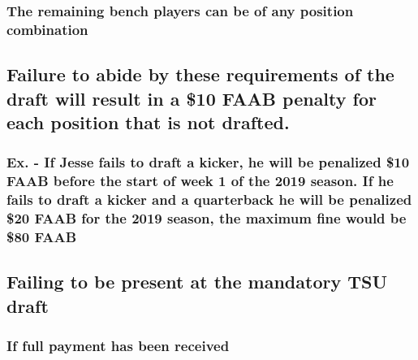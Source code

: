\documentclass[]{book}
\begin{document}
\hypertarget{the-remaining-bench-players-can-be-of-any-position-combination}{%
\subsubsection{The remaining bench players can be of any position combination}\label{the-remaining-bench-players-can-be-of-any-position-combination}}

\hypertarget{failure-to-abide-by-these-requirements-of-the-draft-will-result-in-a-10-faab-penalty-for-each-position-that-is-not-drafted.}{%
\subsection{Failure to abide by these requirements of the draft will result in a \$10 FAAB penalty for each position that is not drafted.}\label{failure-to-abide-by-these-requirements-of-the-draft-will-result-in-a-10-faab-penalty-for-each-position-that-is-not-drafted.}}

\hypertarget{ex.---if-jesse-fails-to-draft-a-kicker-he-will-be-penalized-10-faab-before-the-start-of-week-1-of-the-2019-season.-if-he-fails-to-draft-a-kicker-and-a-quarterback-he-will-be-penalized-20-faab-for-the-2019-season-the-maximum-fine-would-be-80-faab}{%
\subsubsection{Ex. - If Jesse fails to draft a kicker, he will be penalized \$10 FAAB before the start of week 1 of the 2019 season. If he fails to draft a kicker and a quarterback he will be penalized \$20 FAAB for the 2019 season, the maximum fine would be \$80 FAAB}\label{ex.---if-jesse-fails-to-draft-a-kicker-he-will-be-penalized-10-faab-before-the-start-of-week-1-of-the-2019-season.-if-he-fails-to-draft-a-kicker-and-a-quarterback-he-will-be-penalized-20-faab-for-the-2019-season-the-maximum-fine-would-be-80-faab}}

\hypertarget{failing-to-be-present-at-the-mandatory-tsu-draft}{%
\subsection{Failing to be present at the mandatory TSU draft}\label{failing-to-be-present-at-the-mandatory-tsu-draft}}

\hypertarget{if-full-payment-has-been-received}{%
\subsubsection{If full payment has been received}\label{if-full-payment-has-been-received}}
\end{document}
